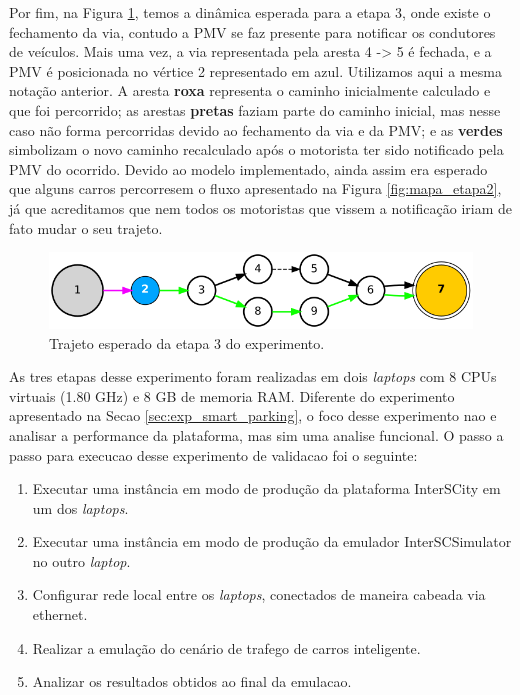 Por fim, na Figura \ref{fig:mapa_etapa3}, temos a dinâmica esperada para a etapa 3, onde existe o fechamento da via, contudo a PMV se faz presente para notificar os condutores de veículos.
Mais uma vez, a via representada pela aresta 4 -> 5 é fechada, e a PMV é posicionada no vértice 2 representado em azul.
Utilizamos aqui a mesma notação anterior.
A aresta \textbf{roxa} representa o caminho inicialmente calculado e que foi percorrido;
as arestas \textbf{pretas} faziam parte do caminho inicial, mas nesse caso não forma percorridas devido ao fechamento da via e da PMV;
e as \textbf{verdes} simbolizam o novo caminho recalculado após o motorista ter sido notificado pela PMV do ocorrido.
Devido ao modelo implementado, ainda assim era esperado que alguns carros percorresem o fluxo apresentado na Figura \ref{fig:mapa_etapa2}, já que acreditamos que nem todos os motoristas que vissem
a notificação iriam de fato mudar o seu trajeto.

\begin{figure}[ht]
	\centering
	\includegraphics[width=\textwidth]{figuras/mapa_etapa3.png}
	\caption{Trajeto esperado da etapa 3 do experimento.}
	\label{fig:mapa_etapa3}
\end{figure}

As tres etapas desse experimento foram realizadas em dois \textit{laptops} com 8 CPUs virtuais (1.80 GHz) e 8 GB de memoria RAM.
Diferente do experimento apresentado na Secao \ref{sec:exp_smart_parking}, o foco desse experimento nao e analisar a performance da plataforma, mas sim uma analise funcional. 
O passo a passo para execucao desse experimento de validacao foi o seguinte:

\begin{enumerate}
    \item Executar uma instância em modo de produção da plataforma InterSCity em um dos \textit{laptops}.

    \item Executar uma instância em modo de produção da emulador InterSCSimulator no outro \textit{laptop}.

    \item Configurar rede local entre os \textit{laptops}, conectados de maneira cabeada via ethernet.

    \item Realizar a emulação do cenário de trafego de carros inteligente.

    \item Analizar os resultados obtidos ao final da emulacao.
\end{enumerate}

